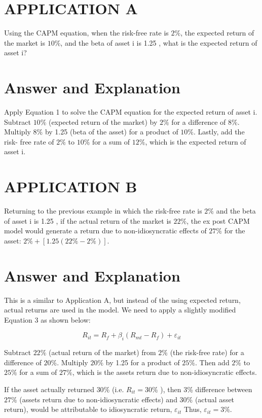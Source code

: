 \documentclass[11pt]{article}
\begin{document}
\section*{APPLICATION A}
Using the CAPM equation, when the risk-free rate is $2 \%$, the expected return of the market is $10 \%$, and the beta of asset $\mathrm{i}$ is 1.25 , what is the expected return of asset i?

\section*{Answer and Explanation}
Apply Equation 1 to solve the CAPM equation for the expected return of asset i. Subtract $10 \%$ (expected return of the market) by $2 \%$ for a difference of $8 \%$. Multiply $8 \%$ by 1.25 (beta of the asset) for a product of $10 \%$. Lastly, add the risk- free rate of $2 \%$ to $10 \%$ for a sum of $12 \%$, which is the expected return of asset $\mathrm{i}$.

\section*{APPLICATION B}
Returning to the previous example in which the risk-free rate is $2 \%$ and the beta of asset $\mathrm{i}$ is 1.25 , if the actual return of the market is $22 \%$, the ex post CAPM model would generate a return due to non-idiosyncratic effects of $27 \%$ for the asset: $2 \%+[1.25(22 \%-2 \%)]$.

\section*{Answer and Explanation}
This is a similar to Application A, but instead of the using expected return, actual returns are used in the model. We need to apply a slightly modified Equation 3 as shown below:

$$
R_{i t}=R_{f}+\beta_{i}\left(R_{m t}-R_{f}\right)+\varepsilon_{i t}
$$

Subtract $22 \%$ (actual return of the market) from $2 \%$ (the risk-free rate) for a difference of $20 \%$. Multiply $20 \%$ by 1.25 for a product of $25 \%$. Then add $2 \%$ to $25 \%$ for a sum of $27 \%$, which is the assets return due to non-idiosyncratic effects.

If the asset actually returned $30 \%$ (i.e. $R_{i t}=30 \%$ ), then 3\% difference between $27 \%$ (assets return due to non-idiosyncratic effects) and $30 \%$ (actual asset return), would be attributable to idiosyncratic return, $\varepsilon_{i t}$ Thus, $\varepsilon_{i t}=3 \%$.
\end{document}
